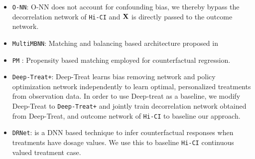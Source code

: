 \documentclass[twoside,11pt]{article}
\begin{document}
\begin{itemize}
    \item \texttt{O-NN}: O-NN does not account for confounding bias, we thereby bypass the decorrelation network of \texttt{Hi-CI} and $\mathbf{X}$ is directly passed to the outcome network.
    \item \texttt{MultiMBNN}: Matching and balancing based architecture proposed in \citep{esann-multiMBNN}
    \item \texttt{PM} : Propensity based matching \citep{schwab2018perfect} employed for counterfactual regression.
    \item \texttt{Deep-Treat+}: Deep-Treat \citep{atan2018deep} learns bias removing network and policy optimization network independently to learn optimal, personalized treatments from observation data. In order to use Deep-treat as a baseline, we modify Deep-Treat to \texttt{Deep-Treat+} and jointly train decorrelation network obtained from Deep-Treat, and outcome network of \texttt{Hi-CI} to baseline our approach.
    \item \texttt{DRNet}: is a DNN based technique \citep{schwab2019learning} to infer counterfactual responses when treatments have dosage values. We use this to baseline \texttt{Hi-CI} continuous valued treatment case.
\end{itemize}



\end{document}
